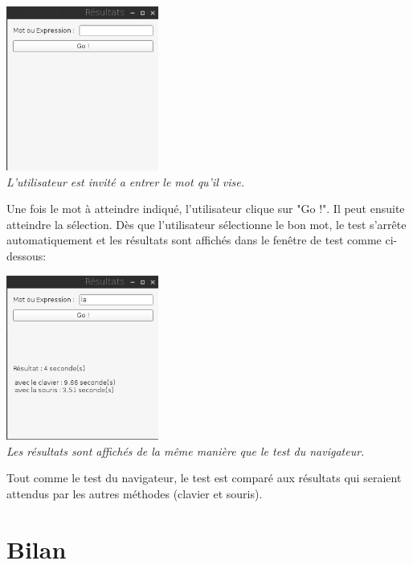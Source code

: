 \documentclass[a4paper, 11pt]{report}
\begin{document}
		\begin{center}
			\includegraphics[width=5cm]{test_editeur}\\
			\emph{L'utilisateur est invité a entrer le mot qu'il vise.}
		\end{center}
		
		Une fois le mot à atteindre indiqué, l'utilisateur clique sur "Go !". Il peut ensuite atteindre la sélection. Dès que l'utilisateur sélectionne le bon mot, le test s'arrête automatiquement et les résultats sont affichés dans le fenêtre de test comme ci-dessous:
		
		\begin{center}
			\includegraphics[width=5cm]{test_edit_finish}\\
			\emph{Les résultats sont affichés de la même manière que le test du navigateur.}
		\end{center}
		
		Tout comme le test du navigateur, le test est comparé aux résultats qui seraient attendus par les autres méthodes (clavier et souris).
		
		
		\chapter{Bilan}
		
\end{document}
